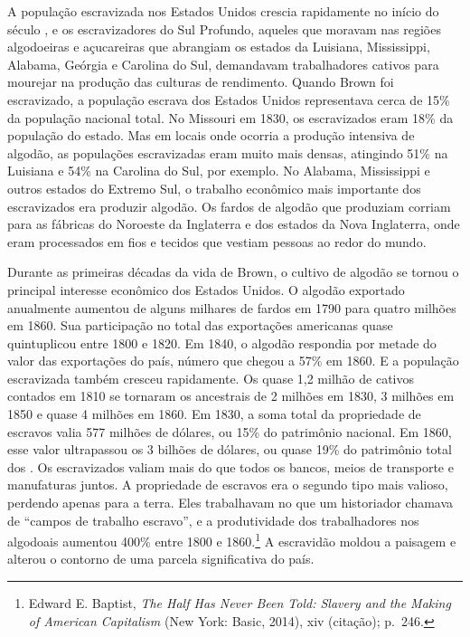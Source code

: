 A população escravizada nos Estados Unidos crescia rapidamente no início
do século , e os escravizadores do Sul Profundo, aqueles que moravam
nas regiões algodoeiras e açucareiras que abrangiam os estados da
Luisiana, Mississippi, Alabama, Geórgia e Carolina do Sul, demandavam
trabalhadores cativos para mourejar na produção das culturas de
rendimento. Quando Brown foi escravizado, a população escrava dos
Estados Unidos representava cerca de 15\% da população nacional total.
No Missouri em 1830, os escravizados eram 18\% da população do estado.
Mas em locais onde ocorria a produção intensiva de algodão, as
populações escravizadas eram muito mais densas, atingindo 51\% na
Luisiana e 54\% na Carolina do Sul, por exemplo. No Alabama, Mississippi
e outros estados do Extremo Sul, o trabalho econômico mais importante
dos escravizados era produzir algodão. Os fardos de algodão que
produziam corriam para as fábricas do Noroeste da Inglaterra e dos
estados da Nova Inglaterra, onde eram processados em fios e tecidos que
vestiam pessoas ao redor do mundo.

Durante as primeiras décadas da vida de Brown, o cultivo de algodão se
tornou o principal interesse econômico dos Estados Unidos. O algodão
exportado anualmente aumentou de alguns milhares de fardos em 1790 para
quatro milhões em 1860. Sua participação no total das exportações
americanas quase quintuplicou entre 1800 e 1820. Em 1840, o algodão
respondia por metade do valor das exportações do país, número que chegou
a 57\% em 1860. E a população escravizada também cresceu rapidamente. Os
quase 1,2 milhão de cativos contados em 1810 se tornaram os ancestrais
de 2 milhões em 1830, 3 milhões em 1850 e quase 4 milhões em 1860.
Em 1830, a soma total da
propriedade de escravos valia 577 milhões de dólares, ou 15\% do
patrimônio nacional. Em 1860, esse valor ultrapassou os 3 bilhões de
dólares, ou quase 19\% do patrimônio total dos .
Os escravizados valiam mais do que
todos os bancos, meios de transporte e manufaturas juntos. A propriedade
de escravos era o segundo tipo mais valioso, perdendo apenas para a
terra. Eles trabalhavam no que um historiador chamava de ``campos de
trabalho escravo'', e a produtividade dos trabalhadores nos algodoais
aumentou 400\% entre 1800 e 1860.\footnote{Edward E. Baptist, \emph{The
  Half Has Never Been Told: Slavery and the Making of American
  Capitalism} (New York: Basic, 2014), xiv (citação); p.~246.} A escravidão
moldou a paisagem e alterou o contorno de uma parcela significativa do
país.

